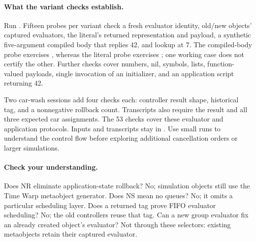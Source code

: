 \paragraph{What the variant checks establish.}
Run . Fifteen probes per
variant check a fresh evaluator identity, old/new objects' captured
evaluators, the literal's returned representation and payload,
a synthetic five-argument compiled body that replies 42, and
 lookup at 7. The compiled-body probe exercises
, whereas the literal probe exercises
; one working case does not certify the other.
Further checks cover numbers, nil, symbols, lists, function-valued payloads,
single invocation of an initializer, and an application script returning 42.

Two car-wash sessions add four checks each: controller result shape,
historical  tag, and a nonnegative rollback count. Transcripts
also require the  result and all three expected car assignments.
The 53 checks cover these evaluator and application protocols.
Inputs and transcripts stay in .
Use small runs to understand the control flow before exploring
additional cancellation orders or larger simulations.

\paragraph{Check your understanding.}
Does NR eliminate application-state rollback? No; simulation objects
still use the Time Warp metaobject generator. Does NS mean no queues?
No; it omits a particular scheduling layer. Does a returned 
tag prove FIFO evaluator scheduling? No; the old controllers reuse that
tag. Can a new group evaluator fix an already created object's evaluator?
Not through these selectors: existing metaobjects retain their captured evaluator.
